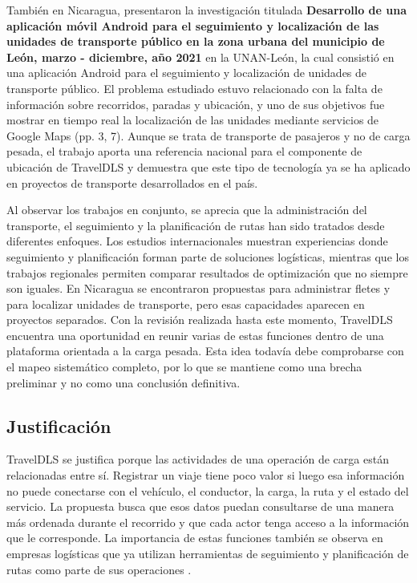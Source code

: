 \label{ant:garcia}
También en Nicaragua, \textcite{garcia2022desarrollo} presentaron la investigación titulada \textbf{Desarrollo de una aplicación móvil Android para el seguimiento y localización de las unidades de transporte público en la zona urbana del municipio de León, marzo - diciembre, año 2021} en la UNAN-León, la cual consistió en una aplicación Android para el seguimiento y localización de unidades de transporte público. El problema estudiado estuvo relacionado con la falta de información sobre recorridos, paradas y ubicación, y uno de sus objetivos fue mostrar en tiempo real la localización de las unidades mediante servicios de Google Maps (pp. 3, 7). Aunque se trata de transporte de pasajeros y no de carga pesada, el trabajo aporta una referencia nacional para el componente de ubicación de TravelDLS y demuestra que este tipo de tecnología ya se ha aplicado en proyectos de transporte desarrollados en el país.

Al observar los trabajos en conjunto, se aprecia que la administración del transporte, el seguimiento y la planificación de rutas han sido tratados desde diferentes enfoques. Los estudios internacionales muestran experiencias donde seguimiento y planificación forman parte de soluciones logísticas, mientras que los trabajos regionales permiten comparar resultados de optimización que no siempre son iguales. En Nicaragua se encontraron propuestas para administrar fletes y para localizar unidades de transporte, pero esas capacidades aparecen en proyectos separados. Con la revisión realizada hasta este momento, TravelDLS encuentra una oportunidad en reunir varias de estas funciones dentro de una plataforma orientada a la carga pesada. Esta idea todavía debe comprobarse con el mapeo sistemático completo, por lo que se mantiene como una brecha preliminar y no como una conclusión definitiva.

\subsection{Justificación}
\label{sec:justificacion}

TravelDLS se justifica porque las actividades de una operación de carga están relacionadas entre sí. Registrar un viaje tiene poco valor si luego esa información no puede conectarse con el vehículo, el conductor, la carga, la ruta y el estado del servicio. La propuesta busca que esos datos puedan consultarse de una manera más ordenada durante el recorrido y que cada actor tenga acceso a la información que le corresponde. La importancia de estas funciones también se observa en empresas logísticas que ya utilizan herramientas de seguimiento y planificación de rutas como parte de sus operaciones \parencite[p. 988]{pauzuoliene2024smart}.

